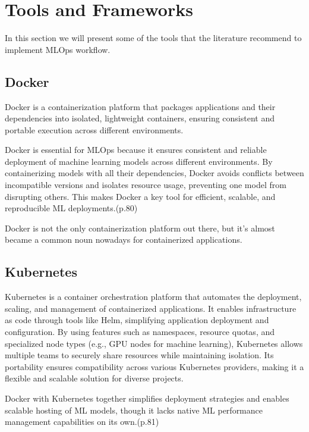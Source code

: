 \section{Tools and Frameworks}\label{sec:tools}

In this section we will present some of the tools that the literature recommend to implement MLOps workflow.

\subsection{Docker}\label{subsec:docker}
Docker\cite{docker} is a containerization platform that packages applications and their dependencies into isolated,
lightweight containers, ensuring consistent and portable execution across different environments.

Docker is essential for MLOps because it ensures consistent and reliable deployment of machine learning models across different environments.
By containerizing models with all their dependencies, Docker avoids conflicts between incompatible versions and isolates resource usage,
preventing one model from disrupting others.
This makes Docker a key tool for efficient, scalable, and reproducible ML deployments.\cite{treveil2020introducing}(p.80)

Docker is not the only containerization platform out there, but it's almost became a common noun nowadays for containerized applications.

\subsection{Kubernetes}\label{subsec:kubernetes2}

Kubernetes\cite{kubernetes} is a container orchestration platform that automates the deployment, scaling, and management of containerized applications.
It enables infrastructure as code through tools like Helm, simplifying application deployment and configuration.
By using features such as namespaces, resource quotas, and specialized node types (e.g., GPU nodes for machine learning),
Kubernetes allows multiple teams to securely share resources while maintaining isolation.
Its portability ensures compatibility across various Kubernetes providers, making it a flexible and scalable solution for diverse projects.

Docker with Kubernetes together simplifies deployment strategies and enables scalable hosting of ML models,
though it lacks native ML performance management capabilities on its own.\cite{treveil2020introducing}(p.81)


